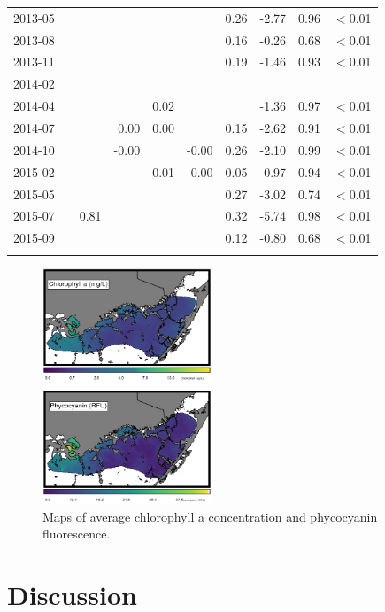 \begin{table}
\begin{tabular}{rrrrrrrrrr}
  2013-05 &  &  &  &  &  & 0.26 & -2.77 & 0.96 & $<$0.01 \\ 
  2013-08 &  &  &  &  &  & 0.16 & -0.26 & 0.68 & $<$0.01 \\ 
  2013-11 &  &  &  &  &  & 0.19 & -1.46 & 0.93 & $<$0.01 \\ 
  2014-02 &  &  &  &  &  &  &  &  &  \\ 
  2014-04 &  &  &  & 0.02 &  &  & -1.36 & 0.97 & $<$0.01 \\ 
  2014-07 &  &  & 0.00 & 0.00 &  & 0.15 & -2.62 & 0.91 & $<$0.01 \\ 
  2014-10 &  &  & -0.00 &  & -0.00 & 0.26 & -2.10 & 0.99 & $<$0.01 \\ 
  2015-02 &  &  &  & 0.01 & -0.00 & 0.05 & -0.97 & 0.94 & $<$0.01 \\ 
  2015-05 &  &  &  &  &  & 0.27 & -3.02 & 0.74 & $<$0.01 \\ 
  2015-07 &  & 0.81 &  &  &  & 0.32 & -5.74 & 0.98 & $<$0.01 \\ 
  2015-09 &  &  &  &  &  & 0.12 & -0.80 & 0.68 & $<$0.01 \\  
   \hline
\noalign{\smallskip}\hline
\end{tabular}
\end{table}


\begin{figure}
  \centering
  \includegraphics[width=0.45\textwidth]{../../figures/avmap.png}
  \caption{Maps of average chlorophyll a concentration and phycocyanin fluorescence.}
  \label{fig:6}
\end{figure}

\section{Discussion}
\label{discussion}

